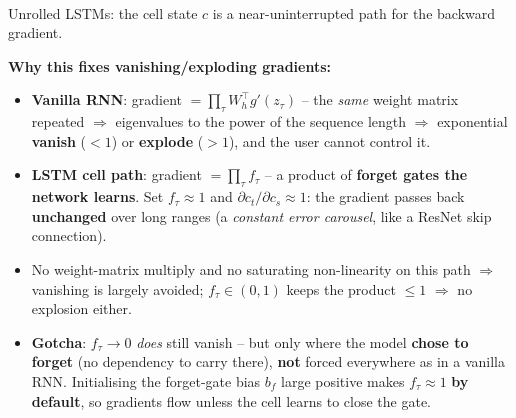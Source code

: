 \documentclass[10pt,a4paper]{article}
\begin{document}
	\begin{center}
	\\[2pt]
	{\footnotesize Unrolled LSTMs: the cell state $c$ is a near-uninterrupted path for the backward gradient.}
	\end{center}

	\begin{importantbox}
		\textbf{Why this fixes vanishing/exploding gradients:}
		\begin{itemize}[leftmargin=*]
			\item \textbf{Vanilla RNN}: gradient $=\prod_\tau W_h^\top g'(z_\tau)$ -- the \emph{same} weight matrix repeated $\Rightarrow$ eigenvalues to the power of the sequence length $\Rightarrow$ exponential \textbf{vanish} ($<1$) or \textbf{explode} ($>1$), and the user cannot control it.
			\item \textbf{LSTM cell path}: gradient $=\prod_\tau f_\tau$ -- a product of \textbf{forget gates the network learns}. Set $f_\tau\!\approx\!1$ and $\partial c_t/\partial c_s\!\approx\!1$: the gradient passes back \textbf{unchanged} over long ranges (a \emph{constant error carousel}, like a ResNet skip connection).
			\item No weight-matrix multiply and no saturating non-linearity on this path $\Rightarrow$ vanishing is largely avoided; $f_\tau\in(0,1)$ keeps the product $\le 1$ $\Rightarrow$ no explosion either.
			\item \textbf{Gotcha}: $f_\tau\!\to\!0$ \emph{does} still vanish -- but only where the model \textbf{chose to forget} (no dependency to carry there), \textbf{not} forced everywhere as in a vanilla RNN. Initialising the forget-gate bias $b_f$ large positive makes $f_\tau\!\approx\!1$ \textbf{by default}, so gradients flow unless the cell learns to close the gate.
		\end{itemize}
	\end{importantbox}
\end{document}
